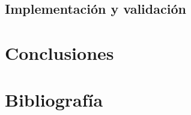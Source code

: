 \documentclass[10pt,letterpaper]{article}
\begin{document}
\subsection{Implementación y validación}





\section{Conclusiones}

\section{Bibliografía}
\end{document}
